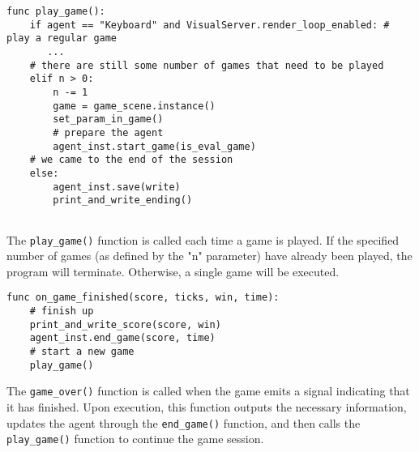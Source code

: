 \begin{lstlisting} 
func play_game():     
    if agent == "Keyboard" and VisualServer.render_loop_enabled: # play a regular game
       ...
    # there are still some number of games that need to be played
    elif n > 0:
        n -= 1
        game = game_scene.instance()
        set_param_in_game()
        # prepare the agent
        agent_inst.start_game(is_eval_game)
    # we came to the end of the session
    else:
        agent_inst.save(write)
        print_and_write_ending()
               
\end{lstlisting}
The \texttt{play\_game()} function is called each time a game is played. If the specified number of games (as defined by the "n" parameter) have already been played, the program will terminate. Otherwise, a single game will be executed.

\begin{lstlisting}
func on_game_finished(score, ticks, win, time):
    # finish up
    print_and_write_score(score, win)
    agent_inst.end_game(score, time)        
    # start a new game
    play_game()
\end{lstlisting}
The \texttt{game\_over()} function is called when the game emits a signal indicating that it has finished. Upon execution, this function outputs the necessary information, updates the agent through the \texttt{end\_game()} function, and then calls the \texttt{play\_game()} function to continue the game session.